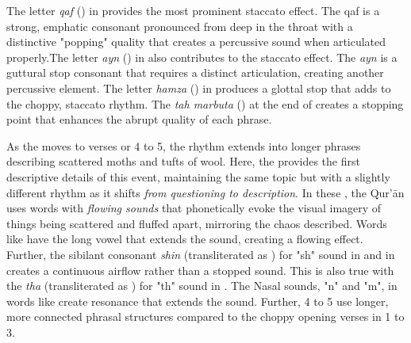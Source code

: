 The letter \textit{qaf} () in   provides the most prominent staccato effect. The qaf is a strong, emphatic consonant pronounced from deep in the throat with a distinctive "popping" quality that creates a percussive sound when articulated properly.The letter \textit{ayn} () in   also contributes to the staccato effect. The \textit{ayn} is a guttural stop consonant that requires a distinct articulation, creating another percussive element. The letter \textit{hamza} () in   produces a glottal stop that adds to the choppy, staccato rhythm. The \textit{tah marbuta} () at the end of   creates a stopping point that enhances the abrupt quality of each phrase.

As the   moves to verses or   4 to 5, the rhythm extends into longer phrases describing scattered moths and tufts of wool. Here, the   provides the first descriptive details of this event, maintaining the same topic but with a slightly different rhythm as it shifts \textit{from questioning to description}. In these  , the Qur'\=an uses words with \textit{flowing sounds} that phonetically evoke the visual imagery of things being scattered and fluffed apart, mirroring the chaos described. Words like   have the long vowel  that extends the sound, creating a flowing effect. Further, the sibilant consonant \textit{shin}  (transliterated as ) for "sh" sound in   and in   creates a continuous airflow rather than a stopped sound. This is also true with the \textit{tha}  (transliterated as ) for "th" sound in  . The Nasal sounds, "n" and "m", in words like   create resonance that extends the sound. Further,   4 to 5 use longer, more connected phrasal structures compared to the choppy opening verses in   1 to 3.

